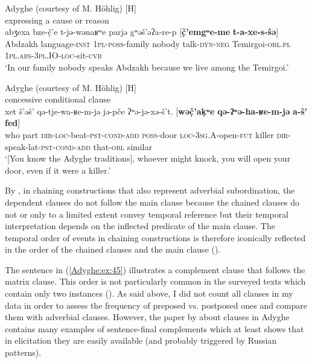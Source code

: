 \documentclass[output=paper,colorlinks,citecolor=brown, draft]{langscibook}
\begin{document}
\ea\label{Adyghe:ex:43}
Adyghe (courtesy of M. Höhlig) [H] \\
 expressing a cause or reason  \\
\gll abʒexa bze-č̣'e t-jə-wənaʁʷe parjə gʷəš'əʔa-re-p [\textbf{č̣'emgʷe-me} \textbf{t-a-xe-s-ŝə}] \\
Abdzakh language\textsc{-inst} \textsc{1pl-poss-}family nobody talk\textsc{-dyn-neg} Temirgoi\textsc{-obl.pl} \textsc{1pl.abs-3pl.IO-loc-}sit\textsc{-cvb} \\
\glt `In our family nobody speaks Abdzakh because we live among the Temirgoi.' 
\z
 
\ea\label{Adyghe:ex:44}
Adyghe (courtesy of M. Höhlig) [H] \\
concessive conditional clause \\
\gll xet š'əš' qə-tje-wa-ʁe-m-jə jə-pče ʔʷə-jə-xə-š't. [\textbf{wəč̣'aḳʷe} \textbf{qə-ʔʷə-ha-ʁe-m-jə} \textbf{a-š'} \textbf{fed}] \\
who part \textsc{dir-}\textsc{loc-}beat\textsc{-pst}\textsc{-cond}\textsc{-add} \textsc{poss-}door \textsc{loc-}\textsc{3sg.A-}open\textsc{-fut} killer \textsc{dir-}speak-lat\textsc{-pst}\textsc{-cond}\textsc{-add} that\textsc{-obl} similar \\
\glt `[You know the Adyghe traditions], whoever might knock, you will open your door, even if it were a killer.' 
\z

By , in chaining constructions that also represent adverbial subordination, the dependent clauses do not follow the main clause because the chained clauses do not or only to a limited extent convey temporal reference but their temporal interpretation depends on the inflected predicate of the main clause. The temporal order of events in chaining constructions is therefore iconically reflected in the order of the chained clauses and the main clause (\citealt{forkerclausechain}).

The sentence in (\ref{Adyghe:ex:45}) illustrates a complement clause that follows the matrix clause. This order is not particularly common in the surveyed texts which contain only two instances (). As said above, I did not count all  clauses in my data in order to assess the frequency of preposed vs. postposed ones and compare them with adverbial clauses. However, the paper by \citet{serdobolskaya2016semantics} about  clauses in Adyghe contains many examples of sentence-final complements which at least shows that in elicitation they are easily available (and probably triggered by Russian  patterns).
\end{document}
